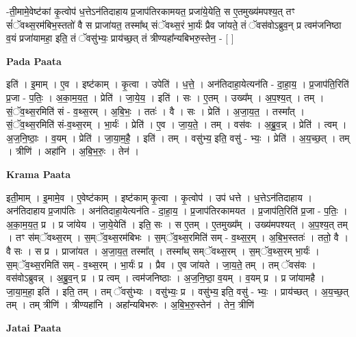 \documentclass[17pt]{extarticle}
\begin{document}
-ती॒मामे॒वेष्ट॑कां कृ॒त्वोप॑ ध॒त्तेऽन॑तिदाहाय प्र॒जाप॑तिरकामयत॒ प्रजा॑ये॒येति॒ स ए॒तमुख्य॑मपश्य॒त् तꣳ सं॑ॅवथ्स॒रम॑बिभ॒स्ततो॑ वै स प्राजा॑यत॒ तस्मा᳚थ् संॅवथ्स॒रं भा॒र्यः॑ प्रैव जा॑यते॒ तं ॅवस॑वोऽब्रुव॒न् प्र त्वम॑जनिष्ठा व॒यं प्रजा॑यामहा॒ इति॒ तं ॅवसु॑भ्यः॒ प्राय॑च्छ॒त् तं त्रीण्यहा᳚न्यबिभरु॒स्तेन॒ - [  ] \newline

\textbf{Pada Paata} \newline

इति॑ । इ॒माम् । ए॒व । इष्ट॑काम् । कृ॒त्वा । उपेति॑ । ध॒त्ते॒ । अन॑तिदाहा॒येत्यन॑ति - दा॒हा॒य॒ । प्र॒जाप॑ति॒रिति॑ प्र॒जा - प॒तिः॒ । अ॒का॒म॒य॒त॒ । प्रेति॑ । जा॒ये॒य॒ । इति॑ । सः । ए॒तम् । उख्य᳚म् । अ॒प॒श्य॒त् । तम् । सं॒ॅव॒थ्स॒रमिति॑ सं - व॒थ्स॒रम् । अ॒बि॒भः॒ । ततः॑ । वै । सः । प्रेति॑ । अ॒जा॒य॒त॒ । तस्मा᳚त् । सं॒ॅव॒थ्स॒रमिति॑ सं-व॒थ्स॒रम् । भा॒र्यः॑ । प्रेति॑ । ए॒व । जा॒य॒ते॒ । तम् । वस॑वः । अ॒ब्रु॒व॒न्न् । प्रेति॑ । त्वम् । अ॒ज॒नि॒ष्ठाः॒ । व॒यम् । प्रेति॑ । जा॒या॒म॒है॒ । इति॑ । तम् । वसु॑भ्य॒ इति॒ वसु॑ - भ्यः॒ । प्रेति॑ । अ॒य॒च्छ॒त् । तम् । त्रीणि॑ । अहा॑नि । अ॒बि॒भ॒रुः॒ । तेन॑ ।  \newline


\textbf{Krama Paata} \newline

इती॒माम् । इ॒मामे॒व । ए॒वेष्ट॑काम् । इष्ट॑काम् कृ॒त्वा । कृ॒त्वोप॑ । उप॑ धत्ते । ध॒त्तेऽन॑तिदाहाय । अन॑तिदाहाय प्र॒जाप॑तिः । अन॑तिदाहा॒येत्यन॑ति - दा॒हा॒य॒ । प्र॒जाप॑तिरकामयत । प्र॒जाप॑ति॒रिति॑ प्र॒जा - प॒तिः॒ । अ॒का॒म॒य॒त॒ प्र । प्र जा॑येय । जा॒ये॒येति॑ । इति॒ सः । स ए॒तम् । ए॒तमुख्य᳚म् । उख्य॑मपश्यत् । अ॒प॒श्य॒त् तम् । तꣳ स॑म्ॅवथ्स॒रम् । स॒म्ॅव॒थ्स॒रम॑बिभः । स॒म्ॅव॒थ्स॒रमिति॑ सम् - व॒थ्स॒र॒म् । अ॒बि॒भ॒स्ततः॑ । ततो॒ वै । वै सः । स प्र । प्राजा॑यत । अ॒जा॒य॒त॒ तस्मा᳚त् । तस्मा᳚थ् सम्ॅवथ्स॒रम् । स॒म्ॅव॒थ्स॒रम् भा॒र्यः॑ । स॒म्ॅव॒थ्स॒रमिति॑ सम् - व॒थ्स॒रम् । भा॒र्यः॑ प्र । प्रैव । ए॒व जा॑यते । जा॒य॒ते॒ तम् । तम् ॅवस॑वः । वस॑वोऽब्रुवन्न् । अ॒ब्रु॒व॒न् प्र । प्र त्वम् । त्वम॑जनिष्ठाः । अ॒ज॒नि॒ष्ठा॒ व॒यम् । व॒यम् प्र । प्र जा॑यामहै । जा॒या॒म॒हा॒ इति॑ । इति॒ तम् । तम् ॅवसु॑भ्यः । वसु॑भ्यः॒ प्र । वसु॑भ्य॒ इति॒ वसु॑ - भ्यः॒ । प्राय॑च्छत् । अ॒य॒च्छ॒त् तम् । तम् त्रीणि॑ । त्रीण्यहा॑नि । अहा᳚न्यबिभरुः । अ॒बि॒भ॒रु॒स्तेन॑ । तेन॒ त्रीणि॑ \newline

\textbf{Jatai Paata} \newline
\end{document}
